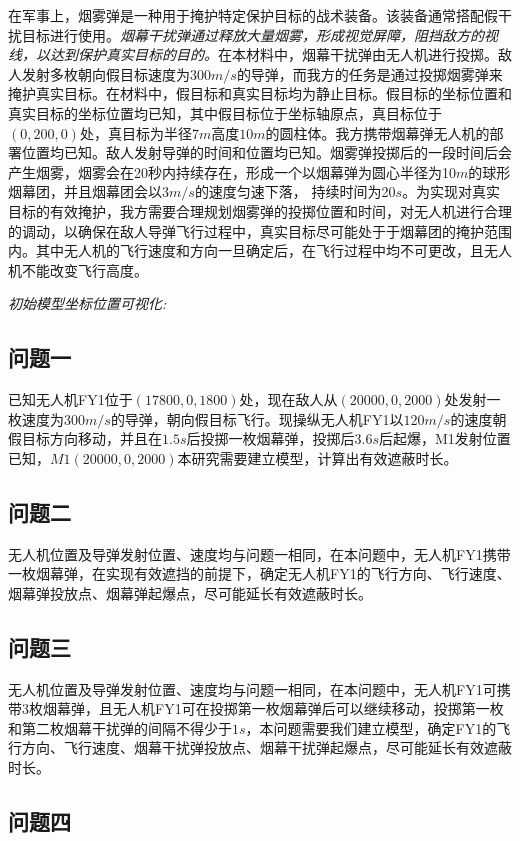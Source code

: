 \documentclass{article}
\begin{document}
在军事上，烟雾弹是一种用于掩护特定保护目标的战术装备。该装备通常搭配假干扰目标进行使用。\textit{烟幕干扰弹通过释放大量烟雾，形成视觉屏障，阻挡敌方的视线，以达到保护真实目标的目的。}在本材料中，烟幕干扰弹由无人机进行投掷。敌人发射多枚朝向假目标速度为$300m/s$的导弹，而我方的任务是通过投掷烟雾弹来掩护真实目标。在材料中，假目标和真实目标均为静止目标。假目标的坐标位置和真实目标的坐标位置均已知，其中假目标位于坐标轴原点，真目标位于$(0,200,0)$处，真目标为半径$7m$高度$10m$的圆柱体。我方携带烟幕弹无人机的部署位置均已知。敌人发射导弹的时间和位置均已知。烟雾弹投掷后的一段时间后会产生烟雾，烟雾会在20秒内持续存在，形成一个以烟幕弹为圆心半径为10$m$的球形烟幕团，并且烟幕团会以$3 m/s$的速度匀速下落，
持续时间为20$s$。为实现对真实目标的有效掩护，我方需要合理规划烟雾弹的投掷位置和时间，对无人机进行合理的调动，以确保在敌人导弹飞行过程中，真实目标尽可能处于于烟幕团的掩护范围内。其中无人机的飞行速度和方向一旦确定后，在飞行过程中均不可更改，且无人机不能改变飞行高度。

\textit{初始模型坐标位置可视化:}

\subsection{问题一}

已知无人机FY1位于$(17800,0,1800)$处，现在敌人从$(20000,0,2000)$处发射一枚速度为$300m/s$的导弹，朝向假目标飞行。现操纵无人机FY1以$120m/s$的速度朝假目标方向移动，并且在$1.5s$后投掷一枚烟幕弹，投掷后$3.6s$后起爆，M1发射位置已知，$M1(20000,0,2000)$本研究需要建立模型，计算出有效遮蔽时长。
\subsection{问题二}

无人机位置及导弹发射位置、速度均与问题一相同，在本问题中，无人机FY1携带一枚烟幕弹，在实现有效遮挡的前提下，确定无人机FY1的飞行方向、飞行速度、烟幕弹投放点、烟幕弹起爆点，尽可能延长有效遮蔽时长。
\subsection{问题三}

无人机位置及导弹发射位置、速度均与问题一相同，在本问题中，无人机FY1可携带3枚烟幕弹，且无人机FY1可在投掷第一枚烟幕弹后可以继续移动，投掷第一枚和第二枚烟幕干扰弹的间隔不得少于$1s$，本问题需要我们建立模型，确定FY1的飞行方向、飞行速度、烟幕干扰弹投放点、烟幕干扰弹起爆点，尽可能延长有效遮蔽时长。
\subsection{问题四}
\end{document}

